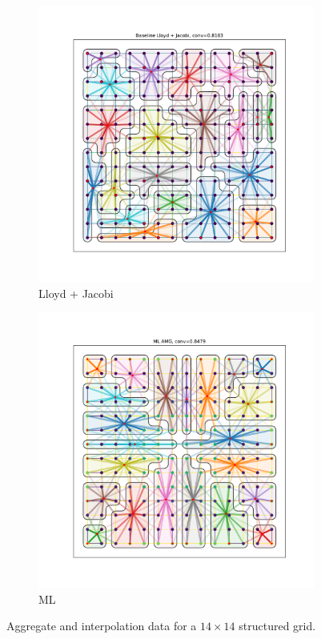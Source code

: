 \documentclass{article}
\begin{document}
\begin{figure}[h]
  \centering
  \begin{subfigure}[t]{0.49\textwidth}
    \centering
    \includegraphics[width=\textwidth]{grid_14_lloyd.pdf}
    \caption{Lloyd + Jacobi}
  \end{subfigure}
  \begin{subfigure}[t]{0.49\textwidth}
    \centering
    \includegraphics[width=\textwidth]{grid_14_ml.pdf}
    \caption{ML}
  \end{subfigure}
  \caption{Aggregate and interpolation data for a $14 \times 14$ structured grid.}
  \label{fig:grid14}
\end{figure}
\end{document}
